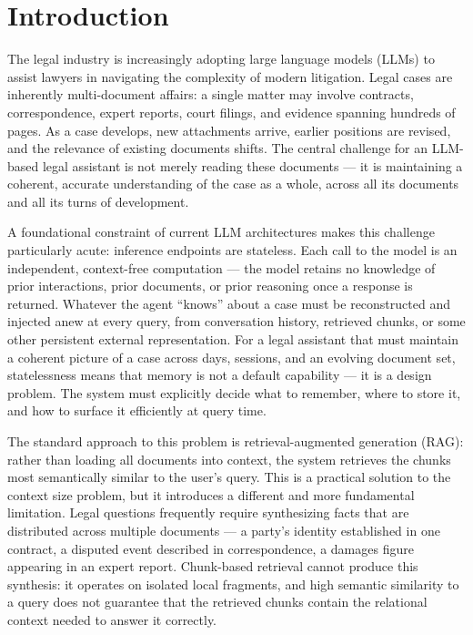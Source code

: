 \chapter{Introduction}

The legal industry is increasingly adopting large language models (LLMs) to assist
lawyers in navigating the complexity of modern litigation. Legal cases are inherently
multi-document affairs: a single matter may involve contracts, correspondence, expert
reports, court filings, and evidence spanning hundreds of pages. As a case develops,
new attachments arrive, earlier positions are revised, and the relevance of existing
documents shifts. The central challenge for an LLM-based legal assistant is not merely
reading these documents --- it is maintaining a coherent, accurate understanding of the
case as a whole, across all its documents and all its turns of development.

A foundational constraint of current LLM architectures makes this challenge particularly
acute: inference endpoints are stateless. Each call to the model is an independent,
context-free computation --- the model retains no knowledge of prior interactions,
prior documents, or prior reasoning once a response is returned. Whatever the agent
``knows'' about a case must be reconstructed and injected anew at every query, from
conversation history, retrieved chunks, or some other persistent external representation.
For a legal assistant that must maintain a coherent picture of a case across days,
sessions, and an evolving document set, statelessness means that memory is not a default
capability --- it is a design problem. The system must explicitly decide what to remember,
where to store it, and how to surface it efficiently at query time.

The standard approach to this problem is retrieval-augmented generation (RAG): rather
than loading all documents into context, the system retrieves the chunks most
semantically similar to the user's query. This is a practical solution to the context
size problem, but it introduces a different and more fundamental limitation. Legal
questions frequently require synthesizing facts that are distributed across multiple
documents --- a party's identity established in one contract, a disputed event described
in correspondence, a damages figure appearing in an expert report. Chunk-based retrieval
cannot produce this synthesis: it operates on isolated local fragments, and high
semantic similarity to a query does not guarantee that the retrieved chunks contain the
relational context needed to answer it correctly. 

